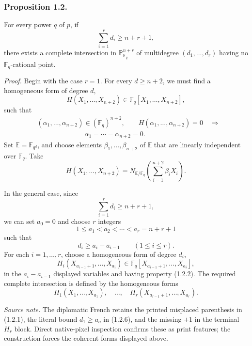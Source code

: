 \subsubsection*{Proposition 1.2.}
For every power $q$ of $p$, if
\begin{equation*}
\sum_{i=1}^{r}d_i\geq n+r+1,
\end{equation*}
there exists a complete intersection in $\mathbb P^{n+r}_{\mathbb F_q}$ of
multidegree $(d_1,\dots,d_r)$ having no $\mathbb F_q$-rational point.

\medskip
\noindent\emph{Proof.}
Begin with the case $r=1$.  For every $d\geq n+2$, we must find a
homogeneous form of degree $d$,
\begin{equation}\tag{1.2.1}
H(X_1,\dots,X_{n+2})\in
\mathbb F_q[X_1,\dots,X_{n+2}],
\end{equation}
such that
\begin{equation}\tag{1.2.2}
\begin{aligned}
&(\alpha_1,\dots,\alpha_{n+2})\in(\mathbb F_q)^{n+2},\qquad
H(\alpha_1,\dots,\alpha_{n+2})=0\quad\Longrightarrow\\
&\hspace{7em}\alpha_1=\cdots=\alpha_{n+2}=0.
\end{aligned}
\end{equation}
Set $\mathbb E=\mathbb F_{q^d}$, and choose elements
$\beta_1,\dots,\beta_{n+2}$ of $\mathbb E$ that are linearly independent
over $\mathbb F_q$.  Take
\begin{equation}\tag{1.2.3}
H(X_1,\dots,X_{n+2})=
N_{\mathbb E/\mathbb F_q}
\left(\sum_{i=1}^{n+2}\beta_iX_i\right).
\end{equation}

In the general case, since
\begin{equation}\tag{1.2.4}
\sum_{i=1}^{r}d_i\geq n+r+1,
\end{equation}
we can set $a_0=0$ and choose $r$ integers
\begin{equation}\tag{1.2.5}
1\leq a_1<a_2<\cdots<a_r=n+r+1
\end{equation}
such that
\begin{equation}\tag{1.2.6}
d_i\geq a_i-a_{i-1}\qquad(1\leq i\leq r).
\end{equation}
For each $i=1,\dots,r$, choose a homogeneous form of degree $d_i$,
\begin{equation*}
H_i(X_{a_{i-1}+1},\dots,X_{a_i})
\in\mathbb F_q[X_{a_{i-1}+1},\dots,X_{a_i}],
\end{equation*}
in the $a_i-a_{i-1}$ displayed variables and having property (1.2.2).
The required complete intersection is defined by the homogeneous forms
\begin{equation*}
H_1(X_1,\dots,X_{a_1}),\quad\dots,\quad
H_r(X_{a_{r-1}+1},\dots,X_{a_r}).
\end{equation*}

\medskip
\noindent\emph{Source note.}
The diplomatic French retains the printed misplaced parenthesis in (1.2.1),
the literal bound $d_1\geq a_o$ in (1.2.6), and the missing $+1$ in the
terminal $H_r$ block.  Direct native-pixel inspection confirms these as print
features; the construction forces the coherent forms displayed above.
